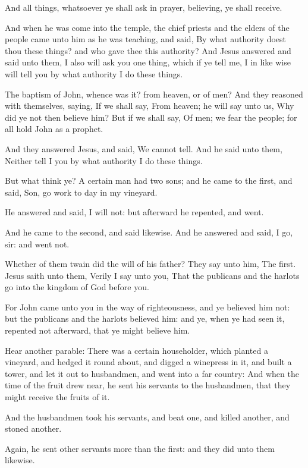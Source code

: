 \Verse And all things, whatsoever ye shall ask in prayer, believing, ye shall receive.

\Verse And when he was come into the temple, the chief priests and the elders of the people came unto him as he was teaching, and said, By what authority doest thou these things? and who gave thee this authority?  \Verse And Jesus answered and said unto them, I also will ask you one thing, which if ye tell me, I in like wise will tell you by what authority I do these things.

\Verse The baptism of John, whence was it? from heaven, or of men? And they reasoned with themselves, saying, If we shall say, From heaven; he will say unto us, Why did ye not then believe him?  \Verse But if we shall say, Of men; we fear the people; for all hold John as a prophet.

\Verse And they answered Jesus, and said, We cannot tell. And he said unto them, Neither tell I you by what authority I do these things.

\Verse But what think ye? A certain man had two sons; and he came to the first, and said, Son, go work to day in my vineyard.

\Verse He answered and said, I will not: but afterward he repented, and went.

\Verse And he came to the second, and said likewise. And he answered and said, I go, sir: and went not.

\Verse Whether of them twain did the will of his father? They say unto him, The first. Jesus saith unto them, Verily I say unto you, That the publicans and the harlots go into the kingdom of God before you.

\Verse For John came unto you in the way of righteousness, and ye believed him not: but the publicans and the harlots believed him: and ye, when ye had seen it, repented not afterward, that ye might believe him.

\Verse Hear another parable: There was a certain householder, which planted a vineyard, and hedged it round about, and digged a winepress in it, and built a tower, and let it out to husbandmen, and went into a far country: \Verse And when the time of the fruit drew near, he sent his servants to the husbandmen, that they might receive the fruits of it.

\Verse And the husbandmen took his servants, and beat one, and killed another, and stoned another.

\Verse Again, he sent other servants more than the first: and they did unto them likewise.

